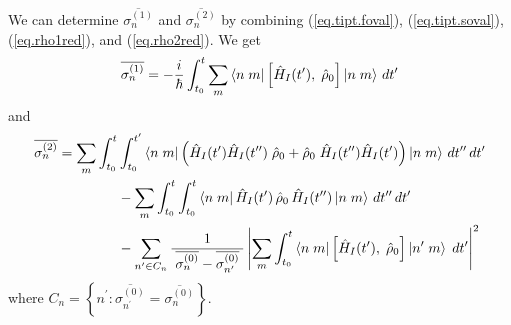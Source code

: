 We can determine \(\overline{\sigma_{n}^{(1)}}\) and \(\overline{\sigma_{n}^{(2)}}\) by combining (\ref{eq.tipt.foval}), (\ref{eq.tipt.soval}), (\ref{eq.rho1red}), and (\ref{eq.rho2red}). We get
\begin{equation}\label{eq.foprobcor}
\overline{\sigma_n^{(1)}} = -\frac{i}{\hbar} \int_{t_0}^t \sum_m \left\langle n\;m\right| \left[\hat{H}_I(t^\prime),\; \hat{\rho}_0 \right]\left|n\;m\right\rangle \,dt^\prime
\end{equation}
and
\begin{align}
\overline{\sigma_n^{(2)}} =
\sum_m\int_{t_0}^t &\int_{t_0}^{t^\prime} \left\langle n\;m\right| \left( \hat{H}_I (t^\prime) \hat{H}_I(t^{\prime\prime}) \;\hat{\rho}_0 + \hat{\rho}_0\; \hat{H}_I (t^{\prime\prime}) \hat{H}_I(t^{\prime}) \right) \left|n\;m\right\rangle\,dt^{\prime\prime}\,dt^\prime \nonumber\\
&- \sum_m\int_{t_0}^t \int_{t_0}^{t} \left\langle n\;m\right|\hat{H}_I (t^\prime) \,\hat{\rho}_0\, \hat{H}_I (t^{\prime\prime})\left|n\;m\right\rangle\,dt^{\prime\prime}\,dt^\prime \nonumber\\
&- \sum_{n^\prime \in C_n} \frac{1}{\;\overline{\sigma_n^{(0)}}-\overline{\sigma_{n^\prime}^{(0)}}\;} \left|\sum_m\int_{t_0}^t \left\langle n\;m\right| \left[\hat{H}_I(t^\prime),\; \hat{\rho}_0 \right] \left|n^\prime\;m\right\rangle\;dt^\prime \right|^2
\label{eq.soprobcor}
\end{align}
where \(C_n = \left\{n^\prime : \overline{\sigma_{n^\prime}^{(0)}} = \overline{\sigma_{n}^{(0)}}\right\}\).

